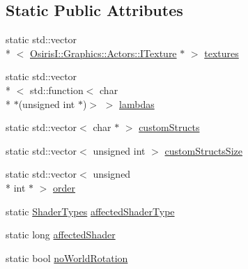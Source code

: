 \subsection*{Static Public Attributes}
\begin{DoxyCompactItemize}
\item 
static std\-::vector\\*
$<$ \hyperlink{class_osiris_i_1_1_graphics_1_1_actors_1_1_i_texture}{Osiris\-I\-::\-Graphics\-::\-Actors\-::\-I\-Texture} $\ast$ $>$ \hyperlink{class_osiris_i_1_1_graphics_1_1_shader_1_1_shader_info_factory_a6783c9b0dad63399d898c78ee08ffb7a}{textures}
\item 
static std\-::vector\\*
$<$ std\-::function$<$ char \\*
$\ast$(unsigned int $\ast$)$>$ $>$ \hyperlink{class_osiris_i_1_1_graphics_1_1_shader_1_1_shader_info_factory_a494988db05d9c399b8f25c9c9fb3292e}{lambdas}
\item 
static std\-::vector$<$ char $\ast$ $>$ \hyperlink{class_osiris_i_1_1_graphics_1_1_shader_1_1_shader_info_factory_a6d0291be011f6408e01c081bd606db57}{custom\-Structs}
\item 
static std\-::vector$<$ unsigned int $>$ \hyperlink{class_osiris_i_1_1_graphics_1_1_shader_1_1_shader_info_factory_aa8d6385f3f0446274c861b6a187b7722}{custom\-Structs\-Size}
\item 
static std\-::vector$<$ unsigned \\*
int $\ast$ $>$ \hyperlink{class_osiris_i_1_1_graphics_1_1_shader_1_1_shader_info_factory_a0dab22a3ea3c7a589767e946f7628b83}{order}
\item 
static \hyperlink{namespace_osiris_i_1_1_graphics_1_1_shader_a337cc6333eff5c701288da2fb4fd9cec}{Shader\-Types} \hyperlink{class_osiris_i_1_1_graphics_1_1_shader_1_1_shader_info_factory_aef798b4d2efbde3f1f1a18f8379e1c6f}{affected\-Shader\-Type}
\item 
static long \hyperlink{class_osiris_i_1_1_graphics_1_1_shader_1_1_shader_info_factory_a69576e019c1efc59a377ce340d4a5d35}{affected\-Shader}
\item 
static bool \hyperlink{class_osiris_i_1_1_graphics_1_1_shader_1_1_shader_info_factory_a8bf10e3b0a6c001818b44556de52f521}{no\-World\-Rotation}
\end{DoxyCompactItemize}


